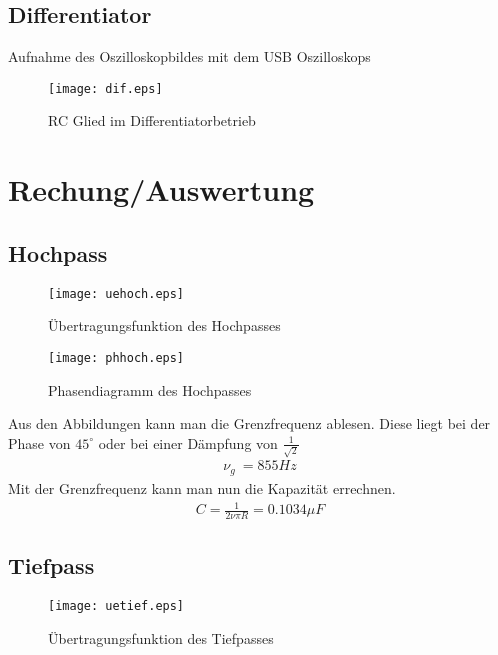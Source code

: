 \documentclass[a4paper]{article}
\begin{document}
\subsection{Differentiator}

Aufnahme des Oszilloskopbildes mit dem USB Oszilloskops
\begin{figure}[ht]
  \begin{center}
    \texttt{[image: dif.eps]}
  \end{center}
  \caption{RC Glied im Differentiatorbetrieb}
  \label{fig:6}
\end{figure}


\newpage
\section{Rechung/Auswertung}
\subsection{Hochpass}

\begin{figure}[ht]
  \begin{center}
    \texttt{[image: uehoch.eps]}
  \end{center}
  \caption{Übertragungsfunktion des Hochpasses}
  \label{fig:1}
\end{figure}

\begin{figure}[ht]
  \begin{center}
    \texttt{[image: phhoch.eps]}
  \end{center}
  \caption{Phasendiagramm des Hochpasses}
  \label{fig:2}
\end{figure}
Aus den Abbildungen kann man die Grenzfrequenz ablesen. Diese liegt bei der Phase von $45^\circ$ oder bei einer Dämpfung von $\frac{1} {\sqrt{2}}$
\begin{align}
  \nu_g ~= 855 Hz
\end{align}
Mit der Grenzfrequenz kann man nun die Kapazität errechnen.
\begin{align}
  C=\frac{1}{2 \nu \pi R}=0.1034\mu F  
\end{align}
\newpage
\subsection{Tiefpass}
\begin{figure}[ht]
  \begin{center}
    \texttt{[image: uetief.eps]}
  \end{center}
  \caption{Übertragungsfunktion des Tiefpasses}
  \label{fig:3}
\end{figure}
\end{document}
